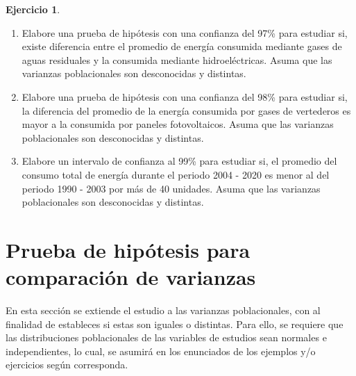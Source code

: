 \documentclass[
  11pt,
]{book}
\theoremstyle{definition}
\theoremstyle{definition}
\theoremstyle{definition}
\newtheorem{exercise}{Ejercicio}[chapter]
\theoremstyle{definition}
\theoremstyle{remark}
\begin{document}
\begin{exercise}
\begin{enumerate}
\def\labelenumi{\arabic{enumi}.}
\item
  Elabore una prueba de hipótesis con una confianza del 97\% para estudiar si, existe diferencia entre el promedio de energía consumida mediante gases de aguas residuales y la consumida mediante hidroeléctricas. Asuma que las varianzas poblacionales son desconocidas y distintas.
\item
  Elabore una prueba de hipótesis con una confianza del 98\% para estudiar si, la diferencia del promedio de la energía consumida por gases de vertederos es mayor a la consumida por paneles fotovoltaicos. Asuma que las varianzas poblacionales son desconocidas y distintas.
\item
  Elabore un intervalo de confianza al 99\% para estudiar si, el promedio del consumo total de energía durante el periodo 2004 - 2020 es menor al del periodo 1990 - 2003 por más de 40 unidades. Asuma que las varianzas poblacionales son desconocidas y distintas.
\end{enumerate}

\end{exercise}

\section{Prueba de hipótesis para comparación de varianzas}\label{prueba-de-hipuxf3tesis-para-comparaciuxf3n-de-varianzas}

En esta sección se extiende el estudio a las varianzas poblacionales, con al finalidad de estableces si estas son iguales o distintas. Para ello, se requiere que las distribuciones poblacionales de las variables de estudios sean normales e independientes, lo cual, se asumirá en los enunciados de los ejemplos y/o ejercicios según corresponda.
\end{document}
